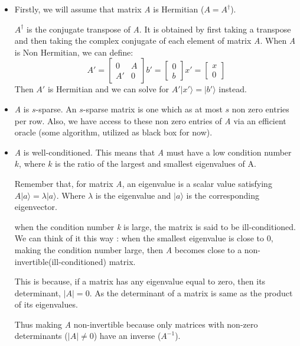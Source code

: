 \documentclass[12pt]{article}
\begin{document}
\begin{itemize}
    \item Firstly, we will assume that matrix \emph{A} is Hermitian ($A  = A^\dagger$).
    
$A^\dagger$ is the conjugate transpose of \emph{A}. It is obtained by first taking a transpose and then taking the complex conjugate of each element of matrix \emph{A}. When \emph{A} is Non Hermitian, we can define:
\begin{displaymath}
A' = \begin{bmatrix}
0 & A\\
A' & 0
\end{bmatrix}
b' = \begin{bmatrix}
0\\
b
\end{bmatrix}
x' = \begin{bmatrix}
x\\
0
\end{bmatrix}
\end{displaymath}
Then $A'$ is Hermitian and we can solve for $A'|x'\rangle = |b'\rangle$ instead.

    \item \emph{A} is $s$-sparse. An $s$-sparse matrix is one which as at most $s$ non zero entries per row. Also, we have access to these non zero entries of \emph{A} via an efficient oracle (some algorithm, utilized as black box for now).
    \item \emph{A} is well-conditioned. This means that \emph{A} must have a low condition number $k$, where $k$ is the ratio of the largest and smallest eigenvalues of A.

Remember that, for matrix \emph{A}, an eigenvalue is a scalar value satisfying $A|a\rangle = \lambda|a\rangle$. Where $\lambda$ is the eigenvalue and $|a\rangle$ is the corresponding eigenvector.\par 
when the condition number \emph{k} is large, the matrix is said to be ill-conditioned. We can think of it this way : when the smallest eigenvalue is close to 0, making the condition number large, then \emph{A} becomes close to a non-invertible(ill-conditioned) matrix.\par
This is because, if a matrix has any eigenvalue equal to zero, then its determinant, $|A| = 0$. As the determinant of a matrix is same as the product of its eigenvalues.\par
Thus making \emph{A} non-invertible because only matrices with non-zero determinants ($|A| \neq 0$) have an inverse ($A^{-1}$).


\end{itemize}
\end{document}
